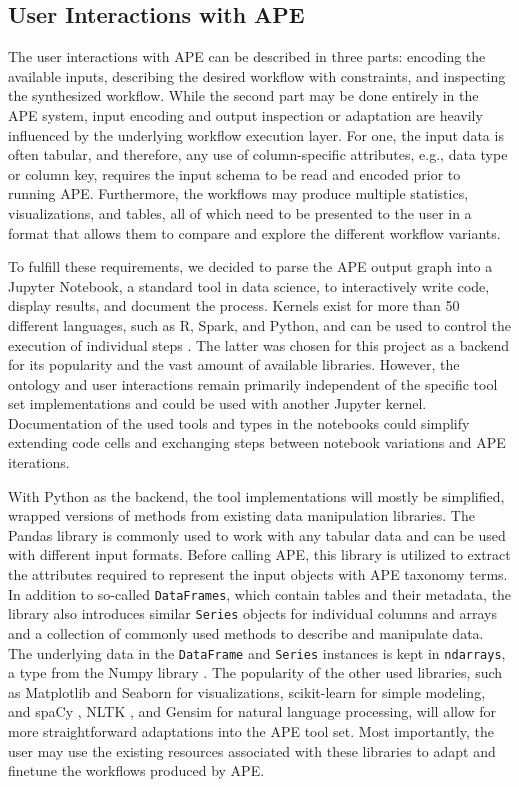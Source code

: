 \subsection{User Interactions with APE}

The user interactions with APE can be described in three parts: encoding the available inputs, describing the desired workflow with constraints, and inspecting the synthesized workflow. While the second part may be done entirely in the APE system, input encoding and output inspection or adaptation are heavily influenced by the underlying workflow execution layer. For one, the input data is often tabular, and therefore, any use of column-specific attributes, e.g., data type or column key, requires the input schema to be read and encoded prior to running APE. Furthermore, the workflows may produce multiple statistics, visualizations, and tables, all of which need to be presented to the user in a format that allows them to compare and explore the different workflow variants.

To fulfill these requirements, we decided to parse the APE output graph into a Jupyter Notebook, a standard tool in data science, to interactively write code, display results, and document the process. Kernels exist for more than 50 different languages, such as R, Spark, and Python, and can be used to control the execution of individual steps \cite{kluyver2016jupyter}. The latter was chosen for this project as a backend for its popularity and the vast amount of available libraries. However, the ontology and user interactions remain primarily independent of the specific tool set implementations and could be used with another Jupyter kernel. Documentation of the used tools and types in the notebooks could simplify extending code cells and exchanging steps between notebook variations and APE iterations.

With Python as the backend, the tool implementations will mostly be simplified, wrapped versions of methods from existing data manipulation libraries. The Pandas library \cite{mckinney2011pandas} is commonly used to work with any tabular data and can be used with different input formats. Before calling APE, this library is utilized to extract the attributes required to represent the input objects with APE taxonomy terms. In addition to so-called \texttt{DataFrames}, which contain tables and their metadata, the library also introduces similar \texttt{Series} objects for individual columns and arrays and a collection of commonly used methods to describe and manipulate data. The underlying data in the \texttt{DataFrame} and \texttt{Series} instances is kept in \texttt{ndarrays}, a type from the Numpy library \cite{numpy}. The popularity of the other used libraries, such as Matplotlib \cite{barrett2005matplotlib} and Seaborn \cite{seaborn} for visualizations, scikit-learn \cite{pedregosa2011scikit} for simple modeling, and spaCy \cite{spaCy}, NLTK \cite{loper2002nltk}, and Gensim \cite{vrehuuvrek2011gensim} for natural language processing, will allow for more straightforward adaptations into the APE tool set. Most importantly, the user may use the existing resources associated with these libraries to adapt and finetune the workflows produced by APE.

